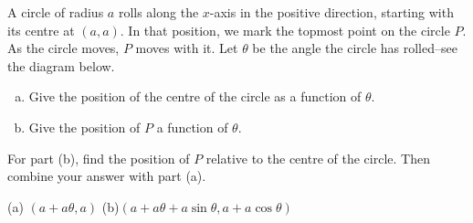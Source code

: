 \begin{question}\label{prob_s1.1_cycloid}

\begin{center}
\end{center}

A circle of radius $a$ rolls along the $x$-axis in the positive direction, starting with its centre at $(a,a)$. In that position, we mark the topmost point on the circle $P$. As the circle moves, $P$ moves with it. Let $\theta$ be  the angle the circle has rolled--see the diagram below.
\begin{enumerate}[(a)]
\item Give the position of the centre of the circle as a function of $\theta$.
\item Give the position of $P$ a function of $\theta$.
\end{enumerate}
\begin{center}
\end{center}

\end{question}
\begin{hint}
For part (b), find the position of $P$ relative to the centre of the circle. Then combine your answer with part (a).
\end{hint}
\begin{answer}
(a) $(a+a\theta,a)$\qquad
(b)$(a+a\theta+a\sin\theta,a+a\cos\theta)$
\end{answer}
